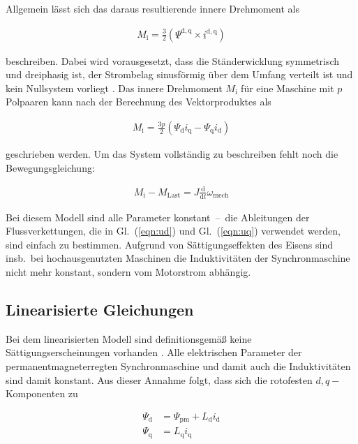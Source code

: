 \documentclass[conference,twocolumn]{IEEEtran}
\newcommand{\x}[1]{\mathrm{#1}}
\begin{document}
Allgemein lässt sich das daraus resultierende innere Drehmoment als

\begin{align}
M_\x{i} = \frac{3}{2} (\underline{\Psi}^{\x{d,q}} \times \underline{i}^{\x{d,q}}) \label{drehmoment}
\end{align}

beschreiben.
Dabei wird vorausgesetzt, dass die Ständerwicklung symmetrisch und dreiphasig ist, der Strombelag sinusförmig über dem Umfang verteilt ist und kein Nullsystem vorliegt \autocite{schroder2001}.
Das innere Drehmoment $M_\x{i}$ für eine Maschine mit $p$ Polpaaren kann nach der Berechnung des Vektorproduktes als

\begin{align}
M_\x{i} = \frac{3p}{2}(\Psi_\x{d} i_\x{q} - \Psi_\x{q} i_\x{d})
\end{align}

geschrieben werden.
Um das System vollständig zu beschreiben fehlt noch die Bewegungsgleichung:

\begin{align}
M_\x{i} - M_\x{Last} = J \frac{\x{d}}{\x{d}t} \omega_{\x{mech}} \label{bewegungsgleichung}
\end{align}

Bei diesem Modell sind alle Parameter konstant~--~die Ableitungen der Flussverkettungen, die in Gl.~(\ref{eqn:ud}) und Gl.~(\ref{eqn:uq}) verwendet werden, sind einfach zu bestimmen.
Aufgrund von Sättigungseffekten des Eisens sind insb.\ bei hochausgenutzten Maschinen die Induktivitäten der Synchronmaschine nicht mehr konstant, sondern vom Motorstrom abhängig.

\subsection{Linearisierte Gleichungen}\label{sec:lin-gleichungen}

Bei dem linearisierten Modell sind definitionsgemäß keine Sättigungserscheinungen vorhanden \autocite{mullerII2008}.
Alle elektrischen Parameter der permanentmagneterregten Synchronmaschine und damit auch die Induktivitäten sind damit konstant.
Aus dieser Annahme folgt, dass sich die rotofesten $d, q-$Komponenten zu

\begin{align}
\Psi_\x{d} &= \Psi_\x{pm} + L_\x{d} i_\x{d} \label{eqn:psid}\\
\Psi_\x{q} &= L_\x{q} i_\x{q} \label{eqn:psiq}
\end{align}
\end{document}
